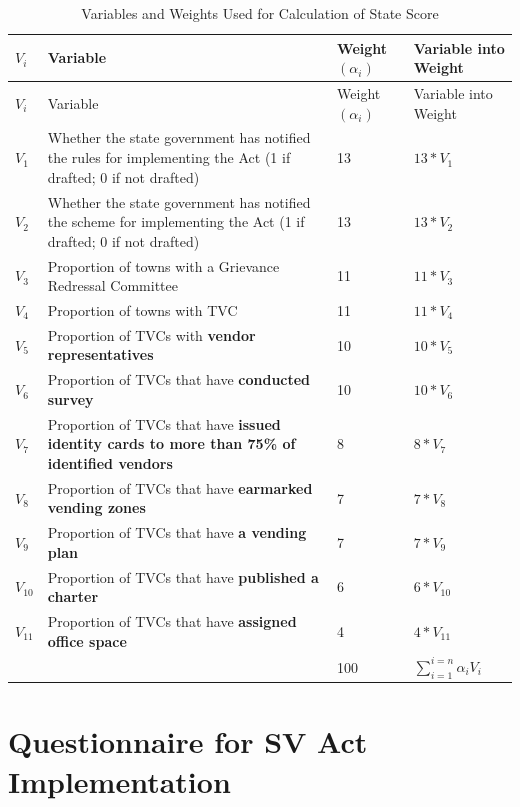 \documentclass[a4paper, 12pt, twoside]{article}
\begin{document}
{{%
\begin{longtable}[l]{>{\raggedright}p{1.5cm}>{\raggedright}p{6cm}>{\raggedright}p{2.5cm}>{\raggedright\arraybackslash}p{4cm}}
  \caption{Variables and Weights Used for Calculation of State Score}\\
    \toprule
$V_i$ & Variable & Weight $(\alpha_i)$ & Variable into Weight \\
\midrule
\endfirsthead
$V_i$ & Variable & Weight $(\alpha_i)$ & Variable into Weight \\
\midrule
\endhead
\bottomrule
\endfoot
\bottomrule
\endlastfoot
$V_1$ & Whether the state government has notified the rules for implementing the Act (1 if drafted; 0 if not drafted) & 13 & $13 * V_1$\\
$V_2$ & Whether the state government has notified the scheme for implementing the Act (1 if drafted; 0 if not drafted) & 13 & $13 * V_2$\\
$V_3$ & Proportion of towns with a Grievance Redressal Committee & 11 & $11 * V_3$\\
$V_4$ & Proportion of towns with TVC & 11 & $11 * V_4$\\
$V_5$ & Proportion of TVCs with \textbf{vendor representatives} & 10 & $10 * V_5$\\
$V_6$ & Proportion of TVCs that have \textbf{conducted survey} & 10 & $10 * V_6$\\
$V_7$ & Proportion of TVCs that have \textbf{issued identity cards to more than 75\% of identified vendors} & 8 & $8 * V_7$\\
$V_8$ & Proportion of TVCs that have \textbf{earmarked vending zones} & 7 & $7 * V_8$\\
$V_9$ & Proportion of TVCs that have \textbf{a vending plan} & 7 & $7 * V_9$\\
$V_{10}$ & Proportion of TVCs that have \textbf{published a charter} & 6 & $6 * V_{10}$\\
$V_{11}$ & Proportion of TVCs that have \textbf{assigned office space} & 4 & $4 * V_{11}$\\
\midrule
& & 100 & $\sum_{i = 1}^{i = n} \alpha_i V_i$\\
\end{longtable}



\section{Questionnaire for SV Act Implementation}
\label{appendix: questionnaire}


}}
\end{document}
